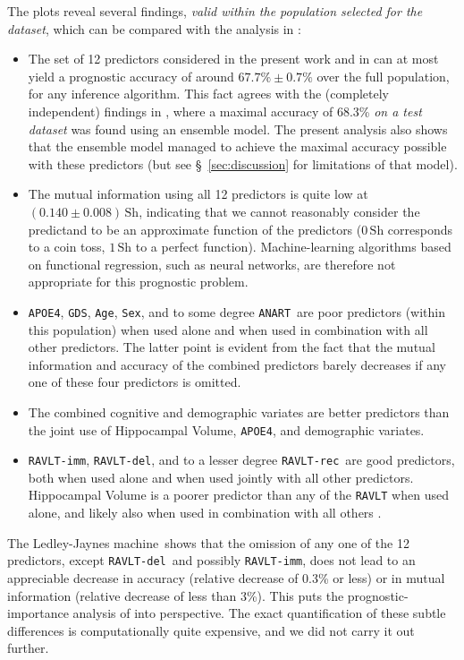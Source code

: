 \documentclass[utf8]{FrontiersinHarvard} %
\newcommand*{\sect}{\S}%
\renewcommand*{\|}[1][]{\nonscript\:#1\vert\nonscript\:\mathopen{}}
\newcommand*{\age}{\texttt{Age}}
\newcommand*{\sex}{\texttt{Sex}}
\newcommand*{\apoe}{\texttt{APOE4}}
\newcommand*{\anart}{\texttt{ANART}}
\newcommand*{\gds}{\texttt{GDS}}
\newcommand*{\ravltimm}{\texttt{RAVLT-imm}}
\newcommand*{\ravltdel}{\texttt{RAVLT-del}}
\newcommand*{\ravltrec}{\texttt{RAVLT-rec}}
\newcommand*{\ljm}{Ledley-Jaynes machine}
\begin{document}
The plots reveal several findings, \emph{valid within the population selected for the dataset}, which can be compared with the analysis in \citet[see especially Fig.~3 and Table~3]{ryeetal2022}:
\begin{itemize}
\item The set of 12 predictors considered in the present work and in \citet{ryeetal2022} can at most yield a prognostic accuracy of around $67.7\%\pm0.7\%$ over the full population, for any inference algorithm. This fact agrees with the (completely independent) findings in \citet{ryeetal2022}, where a maximal accuracy of 68.3\% \emph{on a test dataset} was found using an ensemble model. The present analysis also shows that the ensemble model managed to achieve the maximal accuracy possible with these predictors (but see \sect~\ref{sec:discussion} for limitations of that model).

\item The mutual information using all 12 predictors is quite low at $(0.140\pm 0.008)\,\mathrm{Sh}$, indicating that we cannot reasonably consider the predictand to be an approximate function of the predictors ($0\,\mathrm{Sh}$ corresponds to a coin toss, $1\,\mathrm{Sh}$ to a perfect function). Machine-learning algorithms based on functional regression, such as neural networks, are therefore not appropriate for this prognostic problem.

\item \apoe, \gds, \age, \sex, and to some degree \anart\   are poor predictors (within this population) when used alone and when used in combination with all other predictors. The latter point is evident from the fact that the mutual information and accuracy of the combined predictors barely decreases if any one of these four predictors is omitted.

\item The combined cognitive and demographic variates are better predictors than the joint use of Hippocampal Volume, \apoe, and demographic variates.

\item \ravltimm, \ravltdel, and to a lesser degree \ravltrec\ are good predictors, both when used alone and when used jointly with all other predictors. Hippocampal Volume is a poorer predictor than any of the \texttt{RAVLT} when used alone, and likely also when used in combination with all others \citep[contrast this with][]{ryeetal2022}.
\end{itemize}

The \ljm\ shows that the omission of any one of the 12 predictors, except \ravltdel\ and possibly \ravltimm, does not lead to an appreciable decrease in accuracy (relative decrease of 0.3\% or less) or in mutual information (relative decrease of less than 3\%). This puts the prognostic-importance analysis of \citet{ryeetal2022} into perspective. The exact quantification of these subtle differences is computationally quite expensive, and we did not carry it out further.
\end{document}
